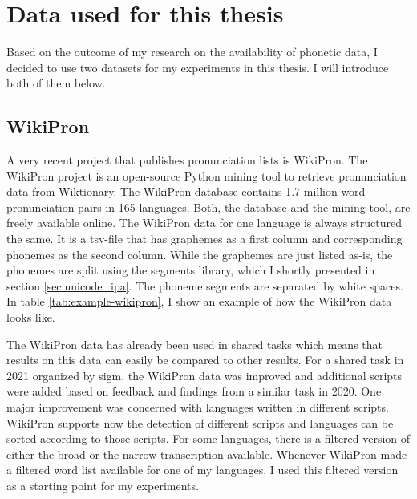 
\section{Data used for this thesis}
\label{sec:dataset}
Based on the outcome of my research on the availability of phonetic data, I decided to use two datasets for my experiments in this thesis. I will introduce both of them below. 

\subsection{WikiPron}
\label{sec:wikipron}
A very recent project that publishes pronunciation lists is WikiPron. The WikiPron project \citep{Lee&Ashby.2020} is an open-source Python mining tool to retrieve pronunciation data from Wiktionary. The WikiPron database contains 1.7 million word-pronunciation pairs in 165 languages. Both, the database and the mining tool, are freely available online. The WikiPron data for one language is always structured the same. It is a tsv-file that has graphemes as a first column and corresponding phonemes as the second column. While the graphemes are just listed as-is, the phonemes are split using the segments library, which I shortly presented in section \ref{sec:unicode_ipa}. The phoneme segments are separated by white spaces. In table \ref{tab:example-wikipron}, I show an example of how the WikiPron data looks like.

The WikiPron data has already been used in shared tasks which means that results on this data can easily be compared to other results. For a shared task in 2021 organized by \ac{sigm}, the WikiPron data was improved and additional scripts were added based on feedback and findings from a similar task in 2020. One major improvement was concerned with languages written in different scripts. WikiPron supports now the detection of different scripts and languages can be sorted according to those scripts. For some languages, there is a filtered version of either the broad or the narrow transcription available. Whenever WikiPron made a filtered word list available for one of my languages, I used this filtered version as a starting point for my experiments.

